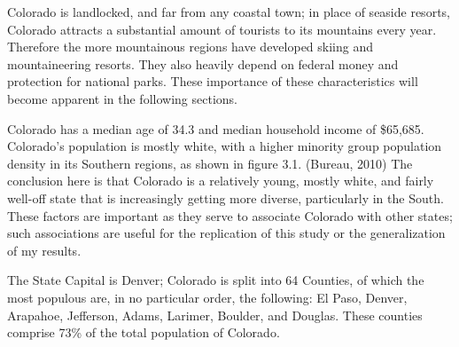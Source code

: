 \documentclass[12pt,twoside]{reedthesis}
\begin{document}
  Colorado is landlocked, and far from any coastal town; in place of
  seaside resorts, Colorado attracts a substantial amount of tourists to
  its mountains every year. Therefore the more mountainous regions have
  developed skiing and mountaineering resorts. They also heavily depend on
  federal money and protection for national parks. These importance of
  these characteristics will become apparent in the following sections.
  
  Colorado has a median age of 34.3 and median household income of
  \$65,685. Colorado's population is mostly white, with a higher minority
  group population density in its Southern regions, as shown in figure
  3.1. (Bureau, 2010) The conclusion here is that Colorado is a relatively
  young, mostly white, and fairly well-off state that is increasingly
  getting more diverse, particularly in the South. These factors are
  important as they serve to associate Colorado with other states; such
  associations are useful for the replication of this study or the
  generalization of my results.
  
  The State Capital is Denver; Colorado is split into 64 Counties, of
  which the most populous are, in no particular order, the following: El
  Paso, Denver, Arapahoe, Jefferson, Adams, Larimer, Boulder, and Douglas.
  These counties comprise 73\% of the total population of Colorado.
  
\end{document}
